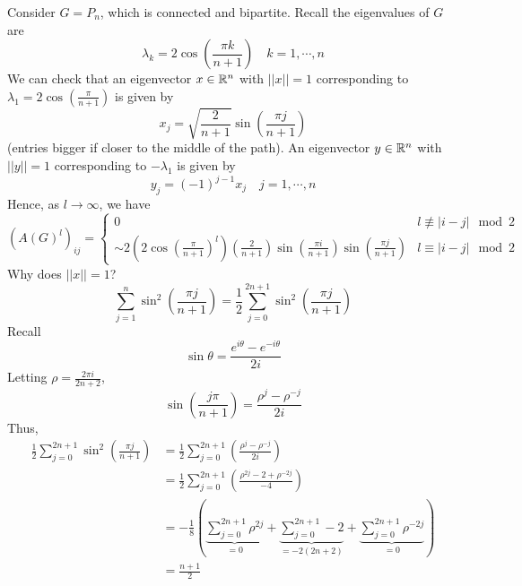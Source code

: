 \begin{example}
Consider \(G=P_n\), which is connected and bipartite.
Recall the eigenvalues of \(G\) are
\[ \lambda_k=2\cos\left(\frac{\pi k}{n+1}\right) \quad k=1,\cdots,n \]
We can check that an eigenvector \(x\in\mathbb{R}^n\) with \(||x||=1\) corresponding to \(\lambda_1=2\cos\left(\frac{\pi}{n+1}\right)\) is given by
\[ x_j=\sqrt{\frac{2}{n+1}}\sin\left(\frac{\pi j}{n+1}\right) \]
(entries bigger if closer to the middle of the path).
An eigenvector \(y\in\mathbb{R}^n\) with \(||y||=1\) corresponding to \(-\lambda_1\) is given by
\[ y_j=(-1)^{j-1}x_j \quad j=1,\cdots,n \]
Hence, as \(l\to\infty\), we have
\[ \left(A(G)^l\right)_{ij}=\begin{cases}0 & l\not\equiv |i-j| \mod 2 \\ \sim 2\left(2\cos\left(\frac{\pi}{n+1}\right)^l \right)\left(\frac{2}{n+1}\right)\sin\left(\frac{\pi i}{n+1}\right)\sin\left(\frac{\pi j}{n+1}\right) & l\equiv |i-j| \mod 2  \end{cases} \]
Why does \(||x||=1\)?
\[ \sum_{j=1}^{n}\sin^2\left(\frac{\pi j}{n+1}\right)=\frac{1}{2}\sum_{j=0}^{2n+1}\sin^2\left(\frac{\pi j}{n+1}\right) \]
Recall
\[ \sin\theta=\frac{e^{i\theta}-e^{-i\theta}}{2i} \]
Letting \(\rho=\frac{2\pi i}{2n+2}\),
\[ \sin\left(\frac{j\pi}{n+1}\right)=\frac{\rho^j-\rho^{-j}}{2i} \]
Thus,
\begin{align*}
\frac{1}{2}\sum_{j=0}^{2n+1}\sin^2\left(\frac{\pi j}{n+1}\right)&=
\frac{1}{2}\sum_{j=0}^{2n+1}\left(\frac{\rho^j-\rho^{-j}}{2i}\right)\\
&=\frac{1}{2}\sum_{j=0}^{2n+1}\left(\frac{\rho^{2j}-2+\rho^{-2j}}{-4}\right)\\
&=-\frac{1}{8}\left(\underbrace{\sum_{j=0}^{2n+1}\rho^{2j}}_{=0}+\underbrace{\sum_{j=0}^{2n+1}-2}_{=-2(2n+2)}+\underbrace{\sum_{j=0}^{2n+1}\rho^{-2j}}_{=0} \right)\\
&=\frac{n+1}{2}
\end{align*}
\end{example}